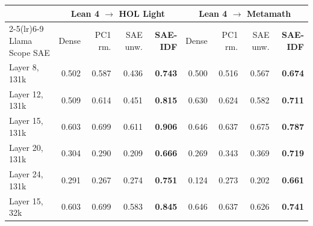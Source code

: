 \begin{tabular}{@{}lrrrrrrrr@{}}
\toprule
 & \multicolumn{4}{c}{Lean 4 $\to$ HOL Light} & \multicolumn{4}{c}{Lean 4 $\to$ Metamath} \\
\cmidrule(lr){2-5}\cmidrule(lr){6-9}
Llama Scope SAE & Dense & PC1 rm. & SAE unw. & \textbf{SAE-IDF} & Dense & PC1 rm. & SAE unw. & \textbf{SAE-IDF} \\
\midrule
Layer 8, 131k & 0.502 & 0.587 & 0.436 & \textbf{0.743} & 0.500 & 0.516 & 0.567 & \textbf{0.674} \\
Layer 12, 131k & 0.509 & 0.614 & 0.451 & \textbf{0.815} & 0.630 & 0.624 & 0.582 & \textbf{0.711} \\
Layer 15, 131k & 0.603 & 0.699 & 0.611 & \textbf{0.906} & 0.646 & 0.637 & 0.675 & \textbf{0.787} \\
Layer 20, 131k & 0.304 & 0.290 & 0.209 & \textbf{0.666} & 0.269 & 0.343 & 0.369 & \textbf{0.719} \\
Layer 24, 131k & 0.291 & 0.267 & 0.274 & \textbf{0.751} & 0.124 & 0.273 & 0.202 & \textbf{0.661} \\
Layer 15, 32k & 0.603 & 0.699 & 0.583 & \textbf{0.845} & 0.646 & 0.637 & 0.626 & \textbf{0.741} \\
\bottomrule
\end{tabular}
